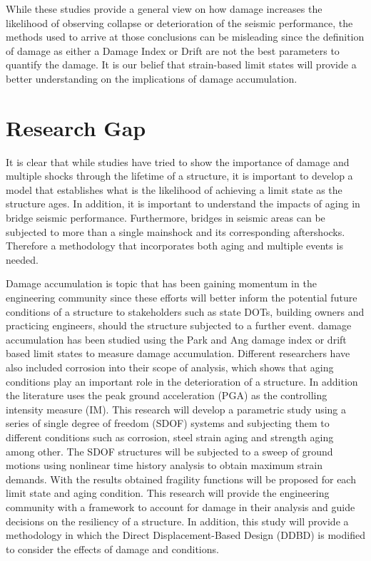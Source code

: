 While these studies provide a general view on how damage increases the likelihood of observing collapse or deterioration of the seismic performance, the methods used to arrive at those conclusions can be misleading since the definition of damage as either a Damage Index or Drift are not the best parameters to quantify the damage. It is our belief that strain-based limit states will provide a better understanding on the implications of damage accumulation.

\section{Research Gap}

It is clear that while studies have tried to show the importance of damage and multiple shocks through the lifetime of a structure, it is important to develop a model that establishes what is the likelihood of achieving a limit state as the structure ages. In addition,  it is important to understand the impacts of aging in bridge seismic performance. Furthermore, bridges in seismic areas can be subjected to more than a single mainshock and its corresponding aftershocks. Therefore a methodology that incorporates both aging and multiple events is needed.

Damage accumulation is topic that has been gaining momentum in the engineering community since these efforts will better inform  the potential future conditions of a structure to stakeholders such as state DOTs, building owners and practicing engineers, should the structure subjected to a further event. damage accumulation has been studied using the Park and Ang damage index or drift based limit states to measure damage accumulation. Different researchers have also included corrosion into their scope of analysis, which shows that aging conditions play an important role in the deterioration of a structure. In addition the literature uses the peak ground acceleration (PGA) as the controlling intensity measure (IM). This research will develop a parametric study using a series of single degree of freedom (SDOF) systems and subjecting them to different conditions such as corrosion, steel strain aging and strength aging among other. The SDOF structures will be subjected to a sweep of ground motions using nonlinear time history analysis to obtain maximum strain demands. With the results obtained fragility functions will be proposed for each limit state and aging condition. This research will provide the engineering community with a framework to account for damage in their analysis and guide decisions on the resiliency of a structure. In addition, this study will provide a methodology in which the Direct Displacement-Based Design (DDBD) is modified to consider the effects of damage and conditions.

